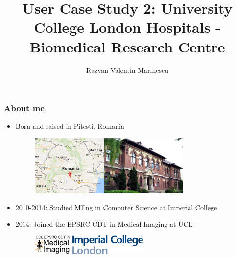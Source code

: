 \documentclass[10pt,xcolor=table]{beamer}
\title{User Case Study 2: University College London Hospitals - Biomedical Research Centre}
\author{Razvan Valentin Marinescu}
\institute{Supervisors: Daniel C. Alexander, Sebastian Crutch}
\date{}
\begin{document}
 
\frame{\titlepage}
 


\begin{frame}
\frametitle{About me}

\begin{itemize}
 \item Born and raised in Pitesti, Romania
 
  \begin{figure}
  \vspace{1em}
  \includegraphics[height=3cm]{pitestiRomania}\hspace{1em}\includegraphics[height=3cm,trim=0 0 0 100,clip]{bratianu}
  \end{figure}
 
 \vspace{1em}
 \item 2010-2014: Studied MEng in Computer Science at Imperial College
 
 \item 2014: Joined the EPSRC CDT in Medical Imaging at UCL
 \vspace{1em}
 \begin{figure}
 \centering 
 \includegraphics[height=1.0cm]{NEWpond2017b.png} \hspace{2em} \includegraphics[height=1.0cm]{logoImperial}  
 \end{figure}

\end{itemize}



\end{frame}
\end{document}
